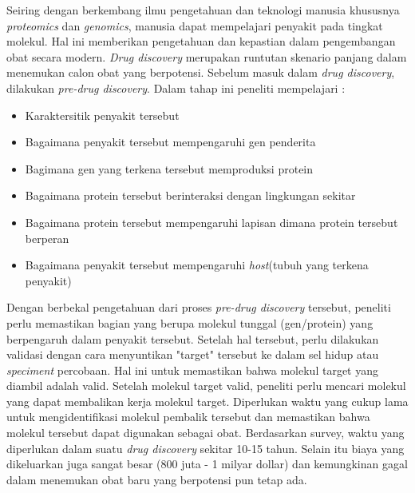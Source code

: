 Seiring dengan berkembang ilmu pengetahuan dan teknologi manusia khususnya \textit{proteomics} dan \textit{genomics}, manusia dapat mempelajari penyakit pada tingkat molekul. Hal ini memberikan pengetahuan dan kepastian dalam pengembangan obat secara modern. \textit{Drug discovery} merupakan runtutan skenario panjang dalam menemukan calon obat yang berpotensi. Sebelum masuk dalam \textit{drug discovery}, dilakukan \textit{pre-drug discovery}. Dalam tahap ini peneliti mempelajari :
\begin{itemize}
	\item Karaktersitik penyakit tersebut
	\item Bagaimana penyakit tersebut mempengaruhi gen penderita
	\item Bagimana gen yang terkena tersebut memproduksi protein
	\item Bagaimana protein tersebut berinteraksi dengan lingkungan sekitar
	\item Bagaimana protein tersebut mempengaruhi lapisan dimana protein tersebut berperan 
	\item Bagaimana penyakit tersebut mempengaruhi \textit{host}(tubuh yang terkena penyakit)
\end{itemize}
 \hspace{0.5 cm}Dengan berbekal pengetahuan dari proses \textit{pre-drug discovery} tersebut, peneliti perlu memastikan bagian yang berupa molekul tunggal (gen/protein) yang berpengaruh dalam penyakit tersebut. Setelah hal tersebut, perlu dilakukan validasi dengan cara menyuntikan "target" tersebut ke dalam sel hidup atau \textit{speciment} percobaan. Hal ini untuk memastikan bahwa molekul target yang diambil adalah valid. Setelah molekul target valid, peneliti perlu mencari molekul yang dapat membalikan kerja molekul target. Diperlukan waktu yang cukup lama untuk mengidentifikasi molekul pembalik tersebut dan memastikan bahwa molekul tersebut dapat digunakan sebagai obat. Berdasarkan survey, waktu yang diperlukan dalam suatu \textit{drug discovery} sekitar 10-15 tahun. Selain itu biaya yang dikeluarkan juga sangat besar (800 juta - 1 milyar dollar) dan kemungkinan gagal dalam menemukan obat baru yang berpotensi pun tetap ada.         

